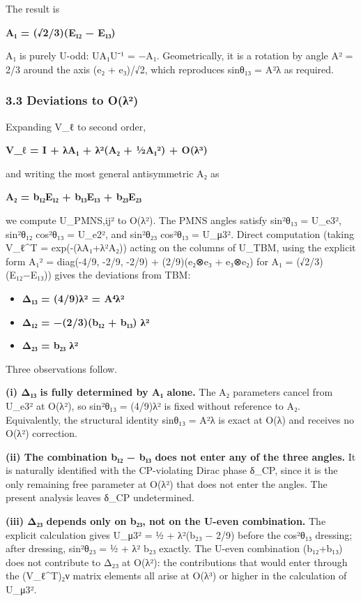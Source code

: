 \documentclass[
  11pt,
  letterpaper,
]{article}
\providecommand{\tightlist}{%
  \setlength{\itemsep}{0pt}\setlength{\parskip}{0pt}}
\begin{document}
The result is

\textbf{A₁ = (√2/3)(E₁₂ − E₁₃)}

A₁ is purely U-odd: UA₁U⁻¹ = −A₁. Geometrically, it is a rotation by
angle A² = 2/3 around the axis (e₂ + e₃)/√2, which reproduces sinθ₁₃ =
A²λ as required.

\hypertarget{deviations-to-oux3bbuxb2}{%
\subsubsection{3.3 Deviations to O(λ²)}\label{deviations-to-oux3bbuxb2}}

Expanding V\_ℓ to second order,

\textbf{V\_ℓ = I + λA₁ + λ²(A₂ + ½A₁²) + O(λ³)}

and writing the most general antisymmetric A₂ as

\textbf{A₂ = b₁₂E₁₂ + b₁₃E₁₃ + b₂₃E₂₃}

we compute \textbar U\_PMNS,ij\textbar² to O(λ²). The PMNS angles
satisfy sin²θ₁₃ = \textbar U\_e3\textbar², sin²θ₁₂ cos²θ₁₃ =
\textbar U\_e2\textbar², and sin²θ₂₃ cos²θ₁₃ = \textbar U\_μ3\textbar².
Direct computation (taking V\_ℓ\^{}T = exp(-(λA₁+λ²A₂)) acting on the
columns of U\_TBM, using the explicit form A₁² = diag(-4/9, -2/9, -2/9)
+ (2/9)(e₂⊗e₃ + e₃⊗e₂) for A₁ = (√2/3)(E₁₂−E₁₃)) gives the deviations
from TBM:

\begin{itemize}
\tightlist
\item
  \textbf{Δ₁₃ = (4/9)λ² = A⁴λ²}
\item
  \textbf{Δ₁₂ = −(2/3)(b₁₂ + b₁₃) λ²}
\item
  \textbf{Δ₂₃ = b₂₃ λ²}
\end{itemize}

Three observations follow.

\textbf{(i) Δ₁₃ is fully determined by A₁ alone.} The A₂ parameters
cancel from \textbar U\_e3\textbar² at O(λ²), so sin²θ₁₃ = (4/9)λ² is
fixed without reference to A₂. Equivalently, the structural identity
sinθ₁₃ = A²λ is exact at O(λ) and receives no O(λ²) correction.

\textbf{(ii) The combination b₁₂ − b₁₃ does not enter any of the three
angles.} It is naturally identified with the CP-violating Dirac phase
δ\_CP, since it is the only remaining free parameter at O(λ²) that does
not enter the angles. The present analysis leaves δ\_CP undetermined.

\textbf{(iii) Δ₂₃ depends only on b₂₃, not on the U-even combination.}
The explicit calculation gives \textbar U\_μ3\textbar² = ½ + λ²(b₂₃ −
2/9) before the cos²θ₁₃ dressing; after dressing, sin²θ₂₃ = ½ + λ² b₂₃
exactly. The U-even combination (b₁₂+b₁₃) does not contribute to Δ₂₃ at
O(λ²): the contributions that would enter through the (V\_ℓ\^{}T)₂ν
matrix elements all arise at O(λ³) or higher in the calculation of
\textbar U\_μ3\textbar².
\end{document}

